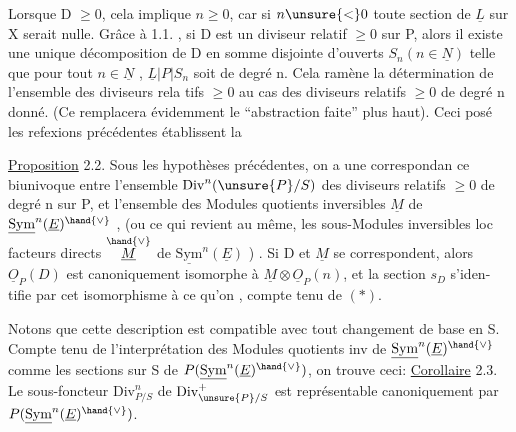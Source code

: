 
Lorsque D $\geq 0$, cela implique $n \geq 0$, car si  $n \unsure{<} 0$ toute section de
$\underline{L}$ sur X serait nulle. Grâce à 1.1. , si D est un diviseur relatif
$\geq 0$ sur P, alors il existe une unique décomposition de D en somme
disjointe d'ouverts $S_n (n \in \underline{N})$ telle que pour tout $n \in \underline{N}$ , $\underline{L}|P|S_n$ soit de
degré n. Cela ramène la détermination de l'ensemble des diviseurs rela%
tifs $\geq 0$ au cas des diviseurs relatifs $\geq 0$ de degré n donné. (Ce
  remplacera évidemment le ``abstraction faite'' plus haut). Ceci posé
les refexions précédentes établissent la

\uline{Proposition} 2.2. Sous les hypothèses précédentes, on a une correspondan%
ce biunivoque entre l'ensemble $\mathrm{Div}^{n}(\unsure{P}/S)$ des diviseurs relatifs $\geq 0$ de
degré n sur P, et l'ensemble des Modules quotients inversibles $\underline{M}$ de
$\underline{\mathrm{Sym}}^{n}(\underline{E})^{\hand{\vee}}$ , (ou ce qui revient au même, les sous-Modules inversibles loc
facteurs directs $\overset{\hand{\vee}}{\underline{M}}$ de $\underline{\mathrm{Sym}}^{n}(\underline{E})$ ) . Si D et $\underline{M}$ se correspondent, alors
$\underline{O}_P(D)$ est canoniquement isomorphe à $\underline{M}\otimes\underline{O}_P(n)$, et la section $s_D$ s'iden-%
tifie par cet isomorphisme à ce qu'on , compte tenu de $(*)$.

Notons que cette description est compatible avec tout changement de
base en S. Compte tenu de l'interprétation des Modules quotients inv de
$\underline{\mathrm{Sym}}^{n}(\underline{E})^{\hand{\vee}}$ comme les sections sur S de $P(\underline{\mathrm{Sym}}^{n}(\underline{E})^{\hand{\vee}})$, on trouve ceci:
\uline{Corollaire} 2.3. Le sous-foncteur  $\mathrm{Div}^{n}_{P/S}$ de $\mathrm{Div}^{+}_{\unsure{P}/S}$ est représentable
canoniquement par $P(\underline{\mathrm{Sym}}^{n}(\underline{E})^{\hand{\vee}})$.


